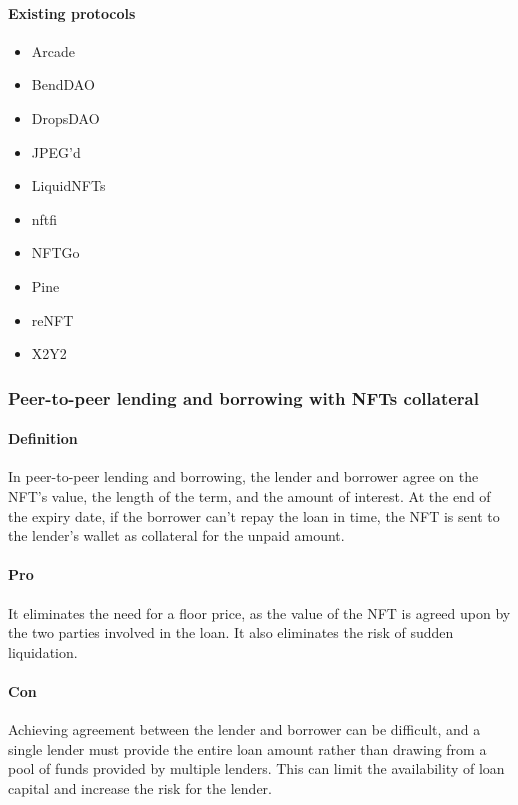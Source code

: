 \paragraph{Existing protocols}
\begin{itemize}
    \item Arcade \cite{Arcade}
    \item BendDAO \cite{BendDAO}
    \item DropsDAO \cite{DropsDAO}
    \item JPEG'd \cite{JPEG'd}
    \item LiquidNFTs \cite{LiquidNFTs}
    \item nftfi \cite{nftfi}
    \item NFTGo \cite{NFTGo}
    \item Pine \cite{Pine}
    \item reNFT \cite{reNFT}
    \item X2Y2 \cite{X2Y2}
\end{itemize}

\subsubsection{Peer-to-peer lending and borrowing with NFTs collateral}
\paragraph{Definition}
In peer-to-peer lending and borrowing, the lender and borrower agree on the NFT's value, the length of the term, and the amount of interest. At the end of the expiry date, if the borrower can’t repay the loan in time, the NFT is sent to the lender’s wallet as collateral for the unpaid amount.
\paragraph{Pro}
It eliminates the need for a floor price, as the value of the NFT is agreed upon by the two parties involved in the loan. It also eliminates the risk of sudden liquidation.
\paragraph{Con}
Achieving agreement between the lender and borrower can be difficult, and a single lender must provide the entire loan amount rather than drawing from a pool of funds provided by multiple lenders. This can limit the availability of loan capital and increase the risk for the lender.

